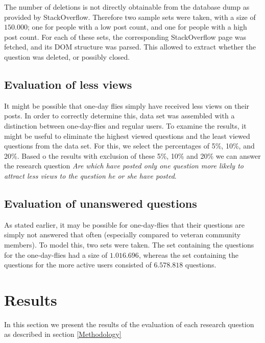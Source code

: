 \documentclass[conference]{IEEEtran}
\begin{document}
The number of deletions is not directly obtainable from the database dump as provided by StackOverflow. Therefore two sample sets were taken, with a size of $150.000$; one for people with a low post count, and one for people with a high post count. For each of these sets, the corresponding StackOverflow page was fetched, and its DOM structure was parsed. This allowed to extract whether the question was deleted, or possibly closed.

\subsection{Evaluation of less views}
It might be possible that one-day flies simply have received less views on their posts.
In order to correctly determine this, data set was assembled with a distinction between one-day-flies and regular users. To examine the results, it might be useful to eliminate the highest viewed questions and the least viewed questions  from the data set. For this, we select the percentages of 5\%, 10\%, and 20\%. Based o the results with exclusion of these 5\%, 10\% and 20\% we can answer the research question \textit{Are which have posted only one question more likely to attract less views to the question he or she have posted}.\\


\subsection{Evaluation of unanswered questions}

As stated earlier, it may be possible for one-day-flies that their questions are simply not answered that often (especially compared to veteran community members). To model this, two sets were taken. The set containing the questions for the one-day-flies had a size of $1.016.696$, whereas the set containing the questions for the more active users consisted of $6.578.818$ questions.

\section{Results}

In this section we present the results of the evaluation of each research question as described in section \ref{Methodology}
\end{document}
